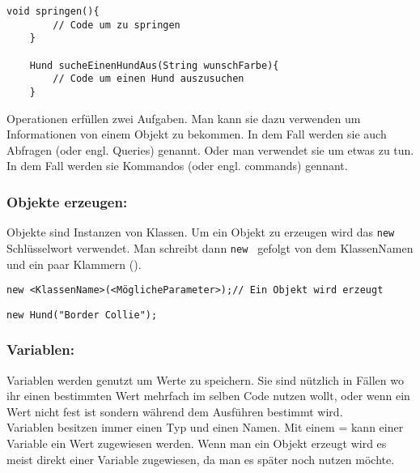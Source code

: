 \begin{lstlisting}[title=\textbf{Operations Beispiel}]
	void springen(){
		// Code um zu springen
	}

	Hund sucheEinenHundAus(String wunschFarbe){
		// Code um einen Hund auszusuchen
	}
\end{lstlisting}

 \begin{Infobox}
              Operationen erfüllen zwei Aufgaben. Man kann sie dazu verwenden um Informationen von einem Objekt zu bekommen.
              In dem Fall werden sie auch Abfragen (oder engl. Queries) genannt.
              Oder man verwendet sie um etwas zu tun. In dem Fall werden sie Kommandos (oder engl. commands) gennant.
\end{Infobox}

\subsubsection*{Objekte erzeugen:}
Objekte sind Instanzen von Klassen.
Um ein Objekt zu erzeugen wird das \lstinline{new} Schlüsselwort verwendet.
Man schreibt dann \lstinline{new } gefolgt von dem KlassenNamen und ein paar Klammern ().

\begin{lstlisting}[title=\textbf{Objekt erstellen Syntax}]
new <KlassenName>(<MöglicheParameter>);// Ein Objekt wird erzeugt
\end{lstlisting}

\begin{lstlisting}[title=\textbf{Objekt erstellen Beispiel}]
new Hund("Border Collie");
\end{lstlisting}

\subsubsection*{Variablen:}
Variablen werden genutzt um Werte zu speichern.
Sie sind nützlich in Fällen wo ihr einen bestimmten Wert mehrfach im selben Code nutzen wollt, oder wenn ein Wert nicht fest ist sondern während dem Ausführen bestimmt wird.\\
Variablen besitzen immer einen Typ und einen Namen.
Mit einem = kann einer Variable ein Wert zugewiesen werden.
Wenn man ein Objekt erzeugt wird es meist direkt einer Variable zugewiesen, da man es später noch nutzen möchte.

